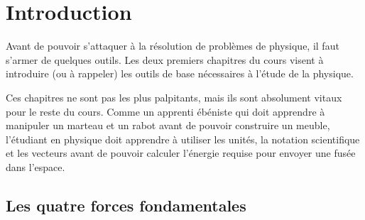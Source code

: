 \newcommand{\teddybear}{
  \fill[color=brown, shift={(1, 0.4)}, rotate=-60] (0, 0) ellipse (0.2 and 0.5);
  \fill[color=brown, shift={(-1, 0.4)}, rotate=60] (0, 0) ellipse (0.2 and 0.5);
  \fill[color=brown, shift={(0.6, -1.2)}, rotate=30] (0, 0) ellipse (0.2 and 0.5);
  \fill[color=brown, shift={(-0.6, -1.2)}, rotate=-30] (0, 0) ellipse (0.2 and 0.5);
  \fill[color=brown] (0, 0) ellipse (0.8 and 1);
  \fill[color=brown!50] (0, -0.2) ellipse (0.4 and 0.5);
  \fill[color=brown, draw=brown!80!black] (-0.5, 1.9) circle (0.3);
  \fill[color=brown!50] (-0.42, 1.8) circle (0.15);
  \fill[color=brown, draw=brown!80!black] (0.5, 1.9) circle (0.3);
  \fill[color=brown!50] (0.42, 1.8) circle (0.15);
  \fill[color=brown, draw=brown!80!black] (0, 1.3) circle (0.6);
  \fill[color=white] (-0.2, 1.4) circle (0.2);
  \fill[color=white] (0.2, 1.4) circle (0.2);
  \fill[color=black] (-0.2, 1.4) circle (0.1);
  \fill[color=black] (0.2, 1.4) circle (0.1);
}

\chapter{Introduction}

Avant de pouvoir s'attaquer à la résolution de problèmes de physique, il faut
s'armer de quelques outils.  Les deux premiers chapitres du cours visent à
introduire (ou à rappeler) les outils de base nécessaires à l'étude de la
physique.

Ces chapitres ne sont pas les plus palpitants, mais ils sont absolument vitaux
pour le reste du cours.  Comme un apprenti ébéniste qui doit apprendre à
manipuler un marteau et un rabot avant de pouvoir construire un meuble,
l'étudiant en physique doit apprendre à utiliser les unités, la notation
scientifique et les vecteurs avant de pouvoir calculer l'énergie requise pour
envoyer une fusée dans l'espace.


\section{Les quatre forces fondamentales}

